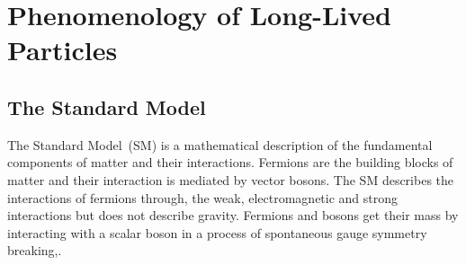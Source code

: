 \chapter{Phenomenology of Long-Lived Particles}
\label{Long_Lived_Particle_physics_chapter}
\section{The Standard Model}
The Standard Model~(SM) is a mathematical description of the fundamental components of matter and their interactions. Fermions are the building blocks of matter and their interaction is mediated by vector bosons. The SM describes the interactions of fermions through, the weak, electromagnetic and strong interactions but does not describe gravity. Fermions and bosons get their mass by interacting with a scalar boson in a process of spontaneous gauge symmetry breaking,\cite{SMREV}. 
